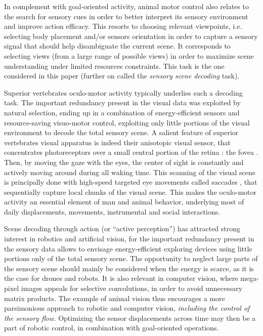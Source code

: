 \documentclass[12pt,twoside,openright]{article}
\begin{document}
In complement with goal-oriented activity, animal motor control also relates to the search for sensory cues in order to better interpret its sensory environment and improve action efficacy. This resorts to choosing relevant viewpoints, i.e. selecting body placement and/or sensors orientation in order to capture a sensory signal that should help disambiguate the current scene. It corresponds to selecting views (from a large range of possible views) in order to maximize scene understanding under limited resources constraints. This task is the one considered in this paper (further on called the \emph{sensory scene decoding} task). 

Superior vertebrates oculo-motor activity typically underlies such a decoding task. The important redundancy present in the visual data was exploited by natural selection, ending up in a combination of energy-efficient sensors and resource-saving visuo-motor control, exploiting only little portions of the visual environment to decode the total sensory scene. A salient feature of superior vertebrates visual apparatus is indeed their anisotopic visual sensor, that concentrates  photoreceptors over a small central portion of the retina : the fovea \citep{osterberg1935topography}. Then, by moving the gaze with the eyes, the center of sight is constantly and actively moving around during all waking time. 
This scanning of the visual scene is principally done with high-speed targeted eye movements called saccades \citep{yarbus1967eye}, that sequentially capture local chunks of the visual scene. This makes the oculo-motor activity an essential element of man and animal behavior, underlying most of daily displacements, movements, instrumental and social interactions. 

Scene decoding through action (or ``active perception'') has attracted strong interest in robotics and artificial vision, for the important redundancy present in the sensory data allows to envisage energy-efficient  exploring devices using  little portions only of the total sensory scene.
The opportunity to neglect large parts of the sensory scene should mainly be considered when the energy is scarce, as it is the case for drones and robots. 
It is also relevant in computer vision, where mega-pixel images appeals for selective convolutions, in order to avoid unnecessary matrix products. 
The example of animal vision thus encourages a more parsimonious approach to robotic and computer vision, \emph{including the control of the sensory flow}. 
Optimizing the sensor displacements across time may then be a part of robotic control, in combination with goal-oriented operations. 
\end{document}
